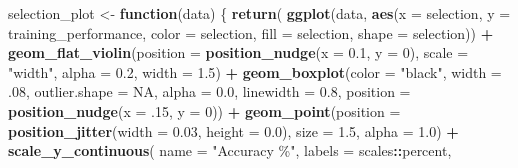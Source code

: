 \documentclass[
]{book}
\newenvironment{Shaded}{\begin{snugshade}}{\end{snugshade}}
\newcommand{\AttributeTok}[1]{\textcolor[rgb]{0.13,0.29,0.53}{#1}}
\newcommand{\ConstantTok}[1]{\textcolor[rgb]{0.56,0.35,0.01}{#1}}
\newcommand{\ControlFlowTok}[1]{\textcolor[rgb]{0.13,0.29,0.53}{\textbf{#1}}}
\newcommand{\DecValTok}[1]{\textcolor[rgb]{0.00,0.00,0.81}{#1}}
\newcommand{\FloatTok}[1]{\textcolor[rgb]{0.00,0.00,0.81}{#1}}
\newcommand{\FunctionTok}[1]{\textcolor[rgb]{0.13,0.29,0.53}{\textbf{#1}}}
\newcommand{\NormalTok}[1]{#1}
\newcommand{\OtherTok}[1]{\textcolor[rgb]{0.56,0.35,0.01}{#1}}
\newcommand{\SpecialCharTok}[1]{\textcolor[rgb]{0.81,0.36,0.00}{\textbf{#1}}}
\newcommand{\StringTok}[1]{\textcolor[rgb]{0.31,0.60,0.02}{#1}}
\begin{document}
\begin{Shaded}
\begin{Highlighting}[]
\NormalTok{selection\_plot }\OtherTok{\textless{}{-}} \ControlFlowTok{function}\NormalTok{(data) \{ }\FunctionTok{return}\NormalTok{(}
    \FunctionTok{ggplot}\NormalTok{(data,}
    \FunctionTok{aes}\NormalTok{(}\AttributeTok{x =}\NormalTok{ selection, }\AttributeTok{y =}\NormalTok{ training\_performance, }\AttributeTok{color =}\NormalTok{ selection,}
                \AttributeTok{fill =}\NormalTok{ selection, }\AttributeTok{shape =}\NormalTok{ selection)) }\SpecialCharTok{+}
    \FunctionTok{geom\_flat\_violin}\NormalTok{(}\AttributeTok{position =} \FunctionTok{position\_nudge}\NormalTok{(}\AttributeTok{x =} \FloatTok{0.1}\NormalTok{, }\AttributeTok{y =} \DecValTok{0}\NormalTok{),}
                    \AttributeTok{scale =} \StringTok{"width"}\NormalTok{, }\AttributeTok{alpha =} \FloatTok{0.2}\NormalTok{, }\AttributeTok{width =} \FloatTok{1.5}\NormalTok{) }\SpecialCharTok{+}
    \FunctionTok{geom\_boxplot}\NormalTok{(}\AttributeTok{color =} \StringTok{"black"}\NormalTok{, }\AttributeTok{width =}\NormalTok{ .}\DecValTok{08}\NormalTok{, }\AttributeTok{outlier.shape =} \ConstantTok{NA}\NormalTok{,}
                \AttributeTok{alpha =} \FloatTok{0.0}\NormalTok{, }\AttributeTok{linewidth =} \FloatTok{0.8}\NormalTok{,}
                \AttributeTok{position =} \FunctionTok{position\_nudge}\NormalTok{(}\AttributeTok{x =}\NormalTok{ .}\DecValTok{15}\NormalTok{, }\AttributeTok{y =} \DecValTok{0}\NormalTok{)) }\SpecialCharTok{+}
    \FunctionTok{geom\_point}\NormalTok{(}\AttributeTok{position =} \FunctionTok{position\_jitter}\NormalTok{(}\AttributeTok{width =} \FloatTok{0.03}\NormalTok{,}
                \AttributeTok{height =} \FloatTok{0.0}\NormalTok{), }\AttributeTok{size =} \FloatTok{1.5}\NormalTok{, }\AttributeTok{alpha =} \FloatTok{1.0}\NormalTok{) }\SpecialCharTok{+}
    \FunctionTok{scale\_y\_continuous}\NormalTok{(}
    \AttributeTok{name =} \StringTok{"Accuracy \%"}\NormalTok{,}
    \AttributeTok{labels =}\NormalTok{ scales}\SpecialCharTok{::}\NormalTok{percent,}


\end{Highlighting}
\end{Shaded}
\end{document}
